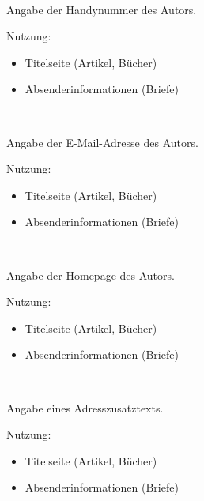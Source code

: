 \begin{nutzung}
		\>\\
	\beispiel
		\>
\end{nutzung}

\DescribeMacro{\handy}
Angabe der Handynummer des Autors.

Nutzung:
\begin{itemize}
	\item Titelseite (Artikel, Bücher)
	\item Absenderinformationen (Briefe)
\end{itemize}

\begin{nutzung}
		\>\\
	\beispiel
		\>
\end{nutzung}

\DescribeMacro{\email}
Angabe der E-Mail-Adresse des Autors.

Nutzung:
\begin{itemize}
	\item Titelseite (Artikel, Bücher)
	\item Absenderinformationen (Briefe)
\end{itemize}

\begin{nutzung}
		\>\\
	\beispiel
		\>
\end{nutzung}

\DescribeMacro{\homepage}
Angabe der Homepage des Autors.

Nutzung:
\begin{itemize}
	\item Titelseite (Artikel, Bücher)
	\item Absenderinformationen (Briefe)
\end{itemize}

\begin{nutzung}
		\>\\
	\beispiel
		\>
\end{nutzung}

\DescribeMacro{\adresszusatz}
Angabe eines Adresszusatztexts.

Nutzung:
\begin{itemize}
	\item Titelseite (Artikel, Bücher)
	\item Absenderinformationen (Briefe)
\end{itemize}

